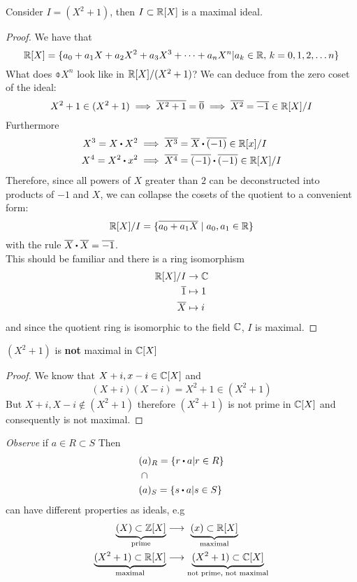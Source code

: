 \documentclass[../Main.tex]{subfiles}
\begin{document}
\begin{claim}
Consider $I=(X^2+1)$, then $I\subset \mathbb{R}[X]$ is a maximal ideal.
\end{claim}
\begin{proof}
	We have that
	\[\mathbb{R}[X] = \{a_0+a_1X+a_2X^2+a_3X^3+\dots+a_nX^n| a_k\in \mathbb{R}, \, k=0,1,2,\dots n\}\]
	What does $\obar{X^n}$ look like in $\mathbb{R}[X]/(X^2+1)$?
	We can deduce from the zero coset of the ideal:
		\[X^2+1 \in (X^2+1) \implies \overline{X^2+1} = \overline{0} \implies \overline{X^2} = \overline{-1} \in \mathbb{R}[X]/I \]
	Furthermore
		\begin{align*}
		X^3 = X\rdot X^2 &\implies \obar{X^3} = \obar{X} \rdot \obar{(-1)} \in \R[x]/I\\
		X^4= X^2\rdot x^2 &\implies \obar{X^4} = \obar{(-1)} \rdot  \obar{(-1)} \in \R[X]/I
	\end{align*}
	Therefore, since all powers of $X$ greater than $2$ can be deconstructed into products of $-1$ and $X$, we can collapse the cosets of the quotient to a convenient form:
	\[\mathbb{R}[X]/I = \{\overline{a_0+a_1X}\mid a_0,a_1\in \mathbb{R}\} \]
	with the rule $\obar{X}\rdot \obar{X}=\obar{-1}$.\\
	This should be familiar and there is a ring isomorphism
	\begin{align*}
	\mathbb{R}[X]/I &\to \mathbb{C} \\
	\overline{1} &\mapsto 1 \\
	\overline{X} &\mapsto i
	\end{align*}
	and since the quotient ring is isomorphic to the field $\mathbb{C}$, $I$ is maximal.
\end{proof}
\begin{claim}
	$(X^2+1)$ is \textbf{not} maximal in $\mathbb{C}[X]$
\end{claim}
\begin{proof}
	We know that $X+i,x-i \in \mathbb{C}[X]$ and
	\[(X+i)(X-i)=X^2+1\in (X^2+1)\]
	But $X+i,X-i \notin (X^2+1)$ therefore $(X^2+1)$ is not prime in $\mathbb{C}[X]$ and consequently is not maximal.
\end{proof}
\textit{Observe} if $a\in R\subset S$ Then
\begin{align*}
(a&)_R = \{r\rdot a | r\in R\}\\
\cap&\\
(a&)_S=\{s\rdot a|s\in S\}
\end{align*}
can have different properties as ideals, e.g
\begin{align*}
\underbrace{(X)\subset \mathbb{Z}[X]}_{\text{prime}} &\longrightarrow \,\,\underbrace{(x) \subset \mathbb{R}[X]}_{\text{maximal}}
\\
\underbrace{(X^2+1)\subset \mathbb{R}[X]}_{\text{maximal}} &\longrightarrow \underbrace{(X^2+1) \subset \mathbb{C}[X]}_{\text{not prime, not maximal}}
\end{align*}\newpage
\end{document}
